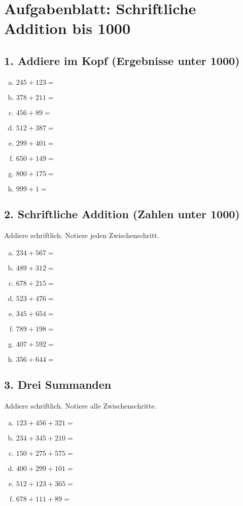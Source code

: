 
\section*{Aufgabenblatt: Schriftliche Addition bis 1000}

\subsection*{1. Addiere im Kopf (Ergebnisse unter 1000)}
\begin{enumerate}[a)]
    \item $245 + 123 =$
    \item $378 + 211 =$
    \item $456 + 89 =$
    \item $512 + 387 =$
    \item $299 + 401 =$
    \item $650 + 149 =$
    \item $800 + 175 =$
    \item $999 + 1 =$
\end{enumerate}

\subsection*{2. Schriftliche Addition (Zahlen unter 1000)}
Addiere schriftlich. Notiere jeden Zwischenschritt.
\begin{enumerate}[a)]
    \item $234 + 567 =$
    \item $489 + 312 =$
    \item $678 + 215 =$
    \item $523 + 476 =$
    \item $345 + 654 =$
    \item $789 + 198 =$
    \item $407 + 592 =$
    \item $356 + 644 =$
\end{enumerate}

\subsection*{3. Drei Summanden}
Addiere schriftlich. Notiere alle Zwischenschritte.
\begin{enumerate}[a)]
    \item $123 + 456 + 321 =$
    \item $234 + 345 + 210 =$
    \item $150 + 275 + 575 =$
    \item $400 + 299 + 101 =$
    \item $512 + 123 + 365 =$
    \item $678 + 111 + 89 =$
\end{enumerate}

